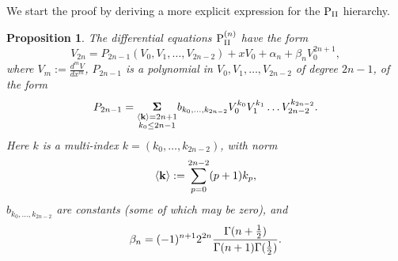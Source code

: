 \documentclass{amsart}
\newtheorem{proposition}[theorem]{Proposition}
\theoremstyle{definition}
\theoremstyle{remark}
\theoremstyle{remark}
\begin{document}
We start the proof by deriving a more explicit expression for
the ${\rm P}_{\rm{\scriptstyle II}}$ hierarchy.
\begin{proposition}\label{nalini1}
The differential equations ${\rm P}^{(n)}_{\rm{\scriptstyle II}}$ have the form
\begin{equation}
V_{2 n}= P_{2n-1}(V_0,V_1,\dots,V_{2n-2}) + x V_0 + \alpha_{n} +
\beta_{n} V_0^{2n+1},
\label{n1}\end{equation}
where $V_m:=\frac{d^{m} V}{dx^{m}}$, $P_{2n-1}$ is a polynomial
in $V_0,V_1,\dots,V_{2n-2}$ of degree $2n-1$, of the form
\begin{equation}\label{polyn}
P_{2n-1}=\underset{{\overset{
\scriptstyle \langle{\bf k}\rangle=2n+1}{\scriptstyle k_0\leq 2n-1}}}
{{\boldsymbol{\Sigma}}}
b_{k_0,\dots,k_{2n-2}} V_0^{k_0} V_1^{k_1}\dots
V_{2n-2}^{k_{2n-2}}.
\end{equation}
Here $k$ is a multi-index $k=(k_0,\ldots, k_{2n-2})$, with norm
\[\langle{\bf k}\rangle:=\sum_{p=0}^{2n-2}(p+1)k_p,\]
$b_{k_0,\dots,k_{2n-2}}$ are constants (some of which may be zero),
and
\[
\beta_{n}=(-1)^{n+1} 2^{2n}
{\Gamma(n+{1\over2})\over\Gamma(n+1)\Gamma({1\over2})}.
\]
\end{proposition}
\end{document}
